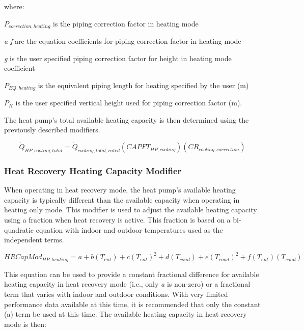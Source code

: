 where:

\(P_{correction,heating}\) is the piping correction factor in heating mode

\emph{a-f} are the equation coefficients for piping correction factor in heating mode

\emph{g} is the user specified piping correction factor for height in heating mode coefficient

\(P_{EQ,heating}\) is the equivalent piping length for heating specified by the user (m)

\(P_H\) is the user specified vertical height used for piping correction factor (m).

The heat pump's total available heating capacity is then determined using the previously described modifiers.

\begin{equation}
  \dot{Q}_{HP,cooling,total} = \dot{Q}_{cooling,total,rated} \left( CAPFT_{HP,cooling} \right) \left( CR_{cooling,correction} \right)
\end{equation}

\subsubsection{Heat Recovery Heating Capacity Modifier}\label{heat-recovery-heating-capacity-modifier}

When operating in heat recovery mode, the heat pump's available heating capacity is typically different than the available capacity when operating in heating only mode. This modifier is used to adjust the available heating capacity using a fraction when heat recovery is active. This fraction is based on a bi-quadratic equation with indoor and outdoor temperatures used as the independent terms.

\begin{equation}
HRCapMod_{HP,heating} = a + b \left( T_{ent} \right) + c \left( T_{ent} \right)^2 + d \left( T_{cond} \right) + e \left( T_{cond} \right)^2 + f \left( T_{ent} \right) \left( T_{cond} \right)
\end{equation}

This equation can be used to provide a constant fractional difference for available heating capacity in heat recovery mode (i.e., only \emph{a} is non-zero) or a fractional term that varies with indoor and outdoor conditions. With very limited performance data available at this time, it is recommended that only the constant (a) term be used at this time. The available heating capacity in heat recovery mode is then:

